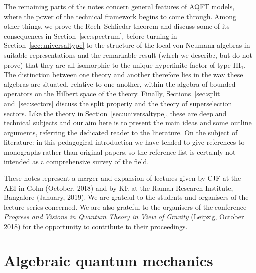 \documentclass[12pt,a4paper]{article}
\newcommand{\1}{\mathds{1}}                         %
\begin{document}
	The remaining parts of the notes concern general features of AQFT models, where the power of the technical framework begins to come through. Among other things, we prove the Reeh--Schlieder theorem and discuss some of its consequences in Section~\ref{sec:spectrum}, before turning in Section~\ref{sec:universaltype} to the structure of the local von Neumann algebras in suitable representations and the remarkable result (which we describe, but do not prove) that they are all isomorphic to the unique hyperfinite factor of type III${}_1$. The distinction between one theory and another therefore lies in the way these algebras are situated, relative to one another, within the algebra of bounded operators on the Hilbert space of the theory. Finally, Sections~\ref{sec:split} and~\ref{sec:sectors} discuss the split property and the theory of superselection sectors. Like the theory in Section~\ref{sec:universaltype}, these are deep and technical subjects and our aim here is to present the main ideas and some outline arguments, referring the dedicated reader to the literature. 
	On the subject of literature: in this pedagogical introduction we have tended to give references to monographs rather than original papers, so the reference list is certainly not intended as a comprehensive survey of the field. 
	
	These notes represent a merger and expansion of lectures given by CJF at the AEI in Golm (October, 2018) and by KR at the Raman Research Institute, Bangalore (January, 2019). We are grateful to the students and organisers of the lecture series concerned. We are also grateful to the organisers of the conference \emph{Progress and Visions in Quantum Theory in View of Gravity} (Leipzig, October 2018) for the opportunity to contribute to their proceedings.
	
\section{Algebraic quantum mechanics}\label{sec:algQM}
\end{document}
